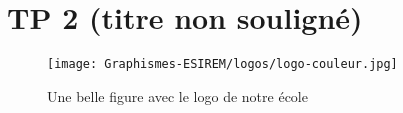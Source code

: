 

\section{TP 2 (titre non souligné)}

\begin{figure}[H]
    \centering
    \texttt{[image: Graphismes-ESIREM/logos/logo-couleur.jpg]}
    \caption{Une belle figure avec le logo de notre école}
\end{figure}